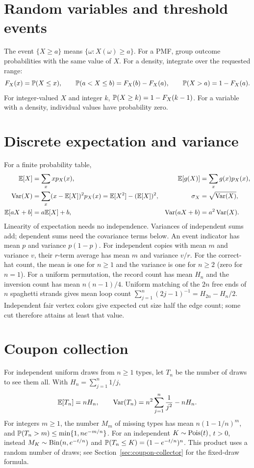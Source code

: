 \section*{Random variables and threshold events}
The event $\{X\ge a\}$ means $\{\omega:X(\omega)\ge a\}$.
For a PMF, group outcome probabilities with the same value of $X$.
For a density, integrate over the requested range:
\[
 F_X(x)=\P(X\le x),\qquad
 \P(a<X\le b)=F_X(b)-F_X(a),\qquad
 \P(X>a)=1-F_X(a).
\]
For integer-valued $X$ and integer $k$, $\P(X\ge k)=1-F_X(k-1)$.
For a variable with a density, individual values have probability zero.

\section*{Discrete expectation and variance}
For a finite probability table,
\begin{align*}
 \E[X]&=\sum_x xp_X(x),&
 \E[g(X)]&=\sum_xg(x)p_X(x),\\
 \Var(X)&=\sum_x(x-\E[X])^2p_X(x)
          =\E[X^2]-(\E[X])^2,&
 \sigma_X&=\sqrt{\Var(X)},\\
 \E[aX+b]&=a\E[X]+b,&
 \Var(aX+b)&=a^2\Var(X).
\end{align*}
Linearity of expectation needs no independence.
Variances of independent sums add; dependent sums need the covariance
terms below. An event indicator has mean $p$ and variance $p(1-p)$.
For independent copies with mean $m$ and variance $v$, their $r$-term
average has mean $m$ and variance $v/r$.
For the correct-hat count, the mean is one for $n\ge1$ and the variance
is one for $n\ge2$ (zero for $n=1$).
For a uniform permutation, the record count has mean $H_n$ and the
inversion count has mean $n(n-1)/4$. Uniform matching of the $2n$ free
ends of $n$ spaghetti strands gives mean loop count
$\sum_{j=1}^n(2j-1)^{-1}=H_{2n}-H_n/2$.
Independent fair vertex colors give expected cut size half the edge count;
some cut therefore attains at least that value.

\section*{Coupon collection}
For independent uniform draws from $n\ge1$ types, let $T_n$ be the
number of draws to see them all. With $H_n=\sum_{j=1}^n1/j$,
\[
 \E[T_n]=nH_n,\qquad
 \Var(T_n)=n^2\sum_{j=1}^n\frac1{j^2}-nH_n.
\]
For integers $m\ge1$, the number $M_m$ of missing types has mean
$n(1-1/n)^m$, and $\P(T_n>m)\le\min\{1,ne^{-m/n}\}$.
For an independent $K\sim\Pois(t)$, $t>0$, instead
$M_K\sim\Bin(n,e^{-t/n})$ and
$\P(T_n\le K)=(1-e^{-t/n})^n$.
This product uses a random number of draws; see
Section~\ref{sec:coupon-collector} for the fixed-draw formula.

